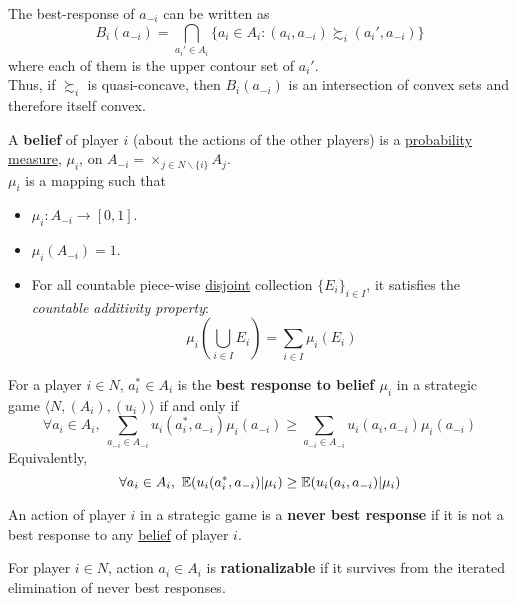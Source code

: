 \documentclass[11pt]{article}
\begin{document}
			\begin{remark}
				The best-response of $a_{-i}$ can be written as 
				\[
					B_i(a_{-i}) = \bigcap_{a_i' \in A_i} \{a_i \in A_i : (a_i, a_{-i}) \succsim_i (a_i', a_{-i})\}
				\]
				where each of them is the upper contour set of $a_i'$. \\
				Thus, if $\succsim_i$ is quasi-concave, then $B_i(a_{-i})$ is an intersection of convex sets and therefore itself convex.
			\end{remark}
			\begin{definition}[pg.54]
				A \textbf{belief} of player $i$ (about the actions of the other players) is a \ul{probability measure}, $\mu_i$, on $A_{-i}=\times_{j \in N \backslash \{i\}} A_j$. \\
				$\mu_i$ is a mapping such that
				\begin{itemize}
					\item $\mu_i: A_{-i} \to [0,1]$.
					\item $\mu_i(A_{-i}) = 1$.
					\item For all countable piece-wise \ul{disjoint} collection $\{E_i\}_{i\in I}$, it satisfies the \emph{countable additivity property}:
					\[
						\mu_i(\bigcup_{i \in I} E_i) = \sum_{i \in I}\mu_i(E_i)
					\]
				\end{itemize}
			\end{definition}
			
			\begin{definition}[lec.2]
				For a player $i \in N$, $a_i^* \in A_i$ is the \textbf{best response to belief $\mu_i$} in a strategic game $\langle N, (A_i), (u_i) \rangle$ if and only if 
				\[
					\forall a_i \in A_i,\ \sum_{a_{-i} \in A_{-i}} u_i(a_i^*, a_{-i}) \mu_i(a_{-i}) \geq \sum_{a_{-i} \in A_{-i}} u_i(a_i, a_{-i}) \mu_i(a_{-i})
				\]
				Equivalently,
				\[
					\forall a_i \in A_i,\ \expect{u_i(a_i^*, a_{-i})|\mu_i} \geq \expect{u_i(a_i, a_{-i})|\mu_i}
				\]
			\end{definition}
			
			\begin{definition}[59.1]
				An action of player $i$ in a strategic game is a \textbf{never best response} if it is not a best response to any \ul{belief} of player $i$.
			\end{definition}
			
			\begin{definition}[lec.2]
				For player $i \in N$, action $a_i \in A_i$ is \textbf{rationalizable} if it survives from the iterated elimination of never best responses.
			\end{definition}
			
\end{document}
